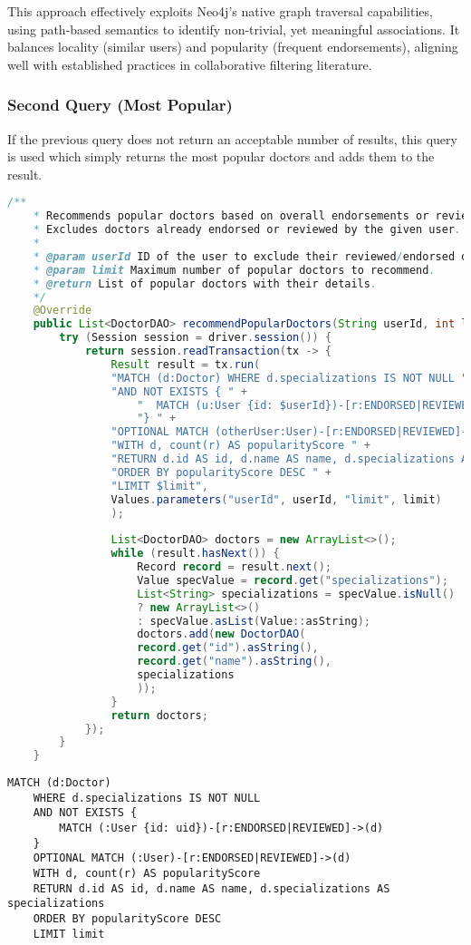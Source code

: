 This approach effectively exploits Neo4j's native graph traversal capabilities, using path-based semantics to identify non-trivial, yet meaningful associations. It balances locality (similar users) and popularity (frequent endorsements), aligning well with established practices in collaborative filtering literature.

\subsubsection{Second Query (Most Popular)}
If the previous query does not return an acceptable number of results, this query is used which simply returns the most popular doctors and adds them to the result.

\begin{lstlisting}[language=java, caption={Java code for the Recommendations with the most popular doctors}]
	/**
	* Recommends popular doctors based on overall endorsements or reviews.
	* Excludes doctors already endorsed or reviewed by the given user.
	*
	* @param userId ID of the user to exclude their reviewed/endorsed doctors.
	* @param limit Maximum number of popular doctors to recommend.
	* @return List of popular doctors with their details.
	*/
	@Override
	public List<DoctorDAO> recommendPopularDoctors(String userId, int limit) {
		try (Session session = driver.session()) {
			return session.readTransaction(tx -> {
				Result result = tx.run(
				"MATCH (d:Doctor) WHERE d.specializations IS NOT NULL " +
				"AND NOT EXISTS { " +
					"  MATCH (u:User {id: $userId})-[r:ENDORSED|REVIEWED]->(d) " +
					"} " +
				"OPTIONAL MATCH (otherUser:User)-[r:ENDORSED|REVIEWED]->(d) " +
				"WITH d, count(r) AS popularityScore " +
				"RETURN d.id AS id, d.name AS name, d.specializations AS specializations " +
				"ORDER BY popularityScore DESC " +
				"LIMIT $limit",
				Values.parameters("userId", userId, "limit", limit)
				);
				
				List<DoctorDAO> doctors = new ArrayList<>();
				while (result.hasNext()) {
					Record record = result.next();
					Value specValue = record.get("specializations");
					List<String> specializations = specValue.isNull()
					? new ArrayList<>()
					: specValue.asList(Value::asString);
					doctors.add(new DoctorDAO(
					record.get("id").asString(),
					record.get("name").asString(),
					specializations
					));
				}
				return doctors;
			});
		}
	}
\end{lstlisting}

\begin{lstlisting}[language=cypher, caption={Equivalent Cypher query for Recommendations with the most popular doctors}]
	MATCH (d:Doctor)
	WHERE d.specializations IS NOT NULL
	AND NOT EXISTS {
		MATCH (:User {id: uid})-[r:ENDORSED|REVIEWED]->(d)
	}
	OPTIONAL MATCH (:User)-[r:ENDORSED|REVIEWED]->(d)
	WITH d, count(r) AS popularityScore
	RETURN d.id AS id, d.name AS name, d.specializations AS specializations
	ORDER BY popularityScore DESC
	LIMIT limit
\end{lstlisting}

